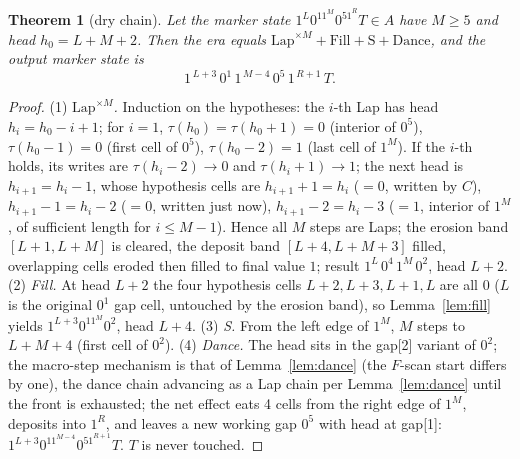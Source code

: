 \documentclass[11pt]{amsart}
\newtheorem{theorem}{Theorem}[section]
\begin{document}
\begin{theorem}[dry chain]\label{thm:dry}
Let the marker state $1^L0^11^M0^51^RT\in A$ have $M\ge5$ and head $h_0=L{+}M{+}2$. Then the era equals $\mathrm{Lap}^{\times M}+\mathrm{Fill}+\mathrm S+\mathrm{Dance}$, and the output marker state is
\[
1^{\,L+3}\,0^1\,1^{\,M-4}\,0^5\,1^{\,R+1}\,T .
\]
\end{theorem}
\begin{proof}
(1) \emph{$\mathrm{Lap}^{\times M}$.} Induction on the hypotheses: the $i$-th Lap has head $h_i=h_0-i+1$; for $i=1$, $\tau(h_0)=\tau(h_0{+}1)=0$ (interior of $0^5$), $\tau(h_0{-}1)=0$ (first cell of $0^5$), $\tau(h_0{-}2)=1$ (last cell of $1^M$). If the $i$-th holds, its writes are $\tau(h_i{-}2)\to0$ and $\tau(h_i{+}1)\to1$; the next head is $h_{i+1}=h_i-1$, whose hypothesis cells are $h_{i+1}{+}1=h_i$ ($=0$, written by $C$), $h_{i+1}{-}1=h_i{-}2$ ($=0$, written just now), $h_{i+1}{-}2=h_i{-}3$ ($=1$, interior of $1^M$, of sufficient length for $i\le M-1$). Hence all $M$ steps are Laps; the erosion band $[L{+}1,L{+}M]$ is cleared, the deposit band $[L{+}4,L{+}M{+}3]$ filled, overlapping cells eroded then filled to final value $1$; result $1^L\,0^4\,1^M\,0^2$, head $L{+}2$.
(2) \emph{Fill.} At head $L{+}2$ the four hypothesis cells $L{+}2,L{+}3,L{+}1,L$ are all $0$ ($L$ is the original $0^1$ gap cell, untouched by the erosion band), so Lemma~\ref{lem:fill} yields $1^{L+3}0^11^M0^2$, head $L{+}4$.
(3) \emph{S.} From the left edge of $1^M$, $M$ steps to $L{+}M{+}4$ (first cell of $0^2$).
(4) \emph{Dance.} The head sits in the gap[2] variant of $0^2$; the macro-step mechanism is that of Lemma~\ref{lem:dance} (the $F$-scan start differs by one), the dance chain advancing as a Lap chain per Lemma~\ref{lem:dance} until the front is exhausted; the net effect eats 4 cells from the right edge of $1^M$, deposits into $1^R$, and leaves a new working gap $0^5$ with head at gap[1]: $1^{L+3}0^11^{M-4}0^51^{R+1}T$. $T$ is never touched.
\end{proof}
\end{document}
